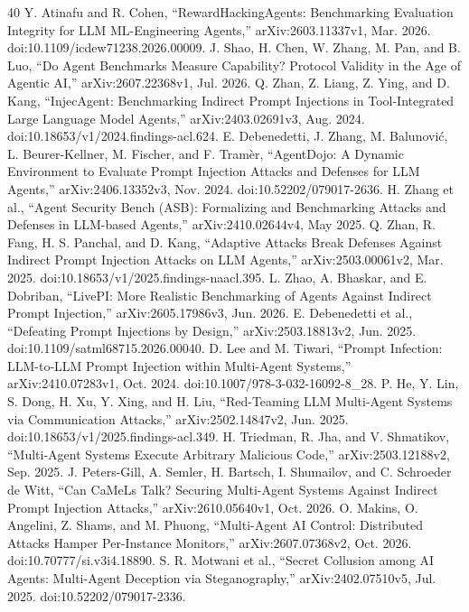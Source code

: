 \begin{thebibliography}{40}
 Y. Atinafu and R. Cohen, “RewardHackingAgents: Benchmarking Evaluation Integrity for LLM ML-Engineering Agents,” arXiv:2603.11337v1, Mar. 2026. doi:10.1109/icdew71238.2026.00009.
 J. Shao, H. Chen, W. Zhang, M. Pan, and B. Luo, “Do Agent Benchmarks Measure Capability? Protocol Validity in the Age of Agentic AI,” arXiv:2607.22368v1, Jul. 2026.
 Q. Zhan, Z. Liang, Z. Ying, and D. Kang, “InjecAgent: Benchmarking Indirect Prompt Injections in Tool-Integrated Large Language Model Agents,” arXiv:2403.02691v3, Aug. 2024. doi:10.18653/v1/2024.findings-acl.624.
 E. Debenedetti, J. Zhang, M. Balunović, L. Beurer-Kellner, M. Fischer, and F. Tramèr, “AgentDojo: A Dynamic Environment to Evaluate Prompt Injection Attacks and Defenses for LLM Agents,” arXiv:2406.13352v3, Nov. 2024. doi:10.52202/079017-2636.
 H. Zhang et al., “Agent Security Bench (ASB): Formalizing and Benchmarking Attacks and Defenses in LLM-based Agents,” arXiv:2410.02644v4, May 2025.
 Q. Zhan, R. Fang, H. S. Panchal, and D. Kang, “Adaptive Attacks Break Defenses Against Indirect Prompt Injection Attacks on LLM Agents,” arXiv:2503.00061v2, Mar. 2025. doi:10.18653/v1/2025.findings-naacl.395.
 L. Zhao, A. Bhaskar, and E. Dobriban, “LivePI: More Realistic Benchmarking of Agents Against Indirect Prompt Injection,” arXiv:2605.17986v3, Jun. 2026.
 E. Debenedetti et al., “Defeating Prompt Injections by Design,” arXiv:2503.18813v2, Jun. 2025. doi:10.1109/satml68715.2026.00040.
 D. Lee and M. Tiwari, “Prompt Infection: LLM-to-LLM Prompt Injection within Multi-Agent Systems,” arXiv:2410.07283v1, Oct. 2024. doi:10.1007/978-3-032-16092-8\_28.
 P. He, Y. Lin, S. Dong, H. Xu, Y. Xing, and H. Liu, “Red-Teaming LLM Multi-Agent Systems via Communication Attacks,” arXiv:2502.14847v2, Jun. 2025. doi:10.18653/v1/2025.findings-acl.349.
 H. Triedman, R. Jha, and V. Shmatikov, “Multi-Agent Systems Execute Arbitrary Malicious Code,” arXiv:2503.12188v2, Sep. 2025.
 J. Peters-Gill, A. Semler, H. Bartsch, I. Shumailov, and C. Schroeder de Witt, “Can CaMeLs Talk? Securing Multi-Agent Systems Against Indirect Prompt Injection Attacks,” arXiv:2610.05640v1, Oct. 2026.
 O. Makins, O. Angelini, Z. Shams, and M. Phuong, “Multi-Agent AI Control: Distributed Attacks Hamper Per-Instance Monitors,” arXiv:2607.07368v2, Oct. 2026. doi:10.70777/si.v3i4.18890.
 S. R. Motwani et al., “Secret Collusion among AI Agents: Multi-Agent Deception via Steganography,” arXiv:2402.07510v5, Jul. 2025. doi:10.52202/079017-2336.

\end{thebibliography}
